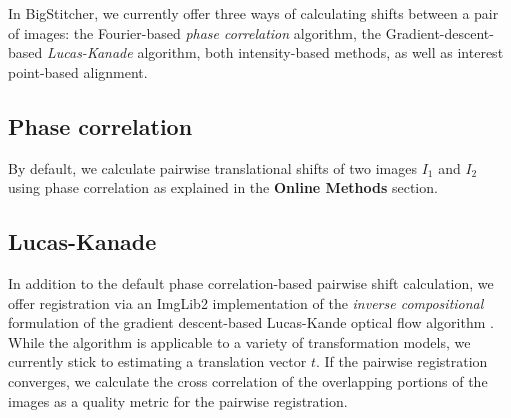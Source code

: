 In BigStitcher, we currently offer three ways of calculating shifts between a pair of images: the Fourier-based \emph{phase correlation} algorithm, the Gradient-descent-based \emph{Lucas-Kanade} algorithm, both intensity-based methods, as well as interest point-based alignment.

\subsection*{Phase correlation}

By default, we calculate pairwise translational shifts of two images $I_1$ and $I_2$ using phase correlation \cite{preibisch2009globally, kuglin1975phase} as explained in the \textbf{Online Methods} section.

%

\subsection*{Lucas-Kanade}

In addition to the default phase correlation-based pairwise shift calculation, we offer registration via an ImgLib2 implementation of the \emph{inverse compositional} formulation of the gradient descent-based Lucas-Kande optical flow algorithm \cite{baker2004lucas}. While the algorithm is applicable to a variety of transformation models, we currently stick to estimating a translation vector $t$. If the pairwise registration converges, we calculate the cross correlation of the overlapping portions of the images as a quality metric for the pairwise registration. 

